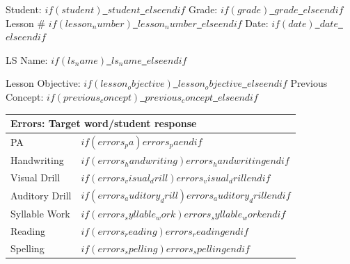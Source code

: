 \documentclass[10pt]{article}
\newcommand{\entry}[1]{\textcolor{inkblue}{#1}}
\newcommand{\blankline}[1]{\textcolor{inkblue}{\underline{\hspace{#1}}}}
\begin{document}

Student: $if(student)$\entry{\underline{~$student$~}}$else$\blankline{1.5in}$endif$\hfill
Grade: $if(grade)$\entry{\underline{~$grade$~}}$else$\blankline{0.4in}$endif$\hfill
Lesson \# $if(lesson_number)$\entry{\underline{~$lesson_number$~}}$else$\blankline{0.5in}$endif$\hfill
Date: $if(date)$\entry{\underline{~$date$~}}$else$\blankline{1.3in}$endif$

\vspace{0.15em}
LS Name: $if(ls_name)$\entry{\underline{~$ls_name$~}}$else$\blankline{1.4in}$endif$

\vspace{0.15em}
Lesson Objective: $if(lesson_objective)$\entry{\underline{~$lesson_objective$~}}$else$\blankline{1.2in}$endif$\hspace{0.5in}
Previous Concept: $if(previous_concept)$\entry{\underline{~$previous_concept$~}}$else$\blankline{1.2in}$endif$

\vspace{1.2em}

\begin{tabularx}{\textwidth}{|p{1.55in}|X|}
\hline
\multicolumn{2}{|l|}{Errors: Target word/student response\rule[-0.6em]{0pt}{1.8em}} \\ \hline
PA\rule[-0.6em]{0pt}{1.8em} & $if(errors_pa)$\entry{$errors_pa$}$endif$ \\ \hline
Handwriting\rule[-0.6em]{0pt}{1.8em} & $if(errors_handwriting)$\entry{$errors_handwriting$}$endif$ \\ \hline
Visual Drill\rule[-0.6em]{0pt}{1.8em} & $if(errors_visual_drill)$\entry{$errors_visual_drill$}$endif$ \\ \hline
Auditory Drill\rule[-0.6em]{0pt}{1.8em} & $if(errors_auditory_drill)$\entry{$errors_auditory_drill$}$endif$ \\ \hline
Syllable Work\rule[-0.6em]{0pt}{1.8em} & $if(errors_syllable_work)$\entry{$errors_syllable_work$}$endif$ \\ \hline
Reading\rule[-0.6em]{0pt}{1.8em} & $if(errors_reading)$\entry{$errors_reading$}$endif$ \\ \hline
Spelling\rule[-0.6em]{0pt}{1.8em} & $if(errors_spelling)$\entry{$errors_spelling$}$endif$ \\ \hline
\end{tabularx}

\vspace{1.2em}
\end{document}
